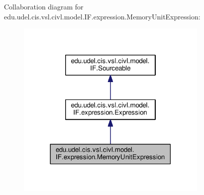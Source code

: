 Collaboration diagram for edu.\+udel.\+cis.\+vsl.\+civl.\+model.\+I\+F.\+expression.\+Memory\+Unit\+Expression\+:
\nopagebreak
\begin{figure}[H]
\begin{center}
\leavevmode
\includegraphics[width=261pt]{interfaceedu_1_1udel_1_1cis_1_1vsl_1_1civl_1_1model_1_1IF_1_1expression_1_1MemoryUnitExpression__coll__graph}
\end{center}
\end{figure}
